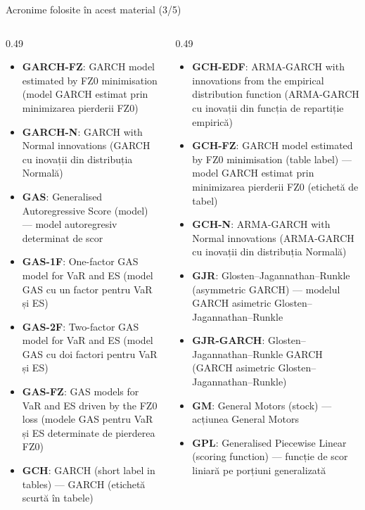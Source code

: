 \begin{frame}{Acronime folosite în acest material (3/5)}
\begin{columns}[T]
\begin{column}{0.49\textwidth}
\begin{itemize}\setlength{\itemsep}{0pt}
    \item \textbf{GARCH-FZ}: GARCH model estimated by FZ0 minimisation (model GARCH estimat prin minimizarea pierderii FZ0)
    \item \textbf{GARCH-N}: GARCH with Normal innovations (GARCH cu inovații din distribuția Normală)
    \item \textbf{GAS}: Generalised Autoregressive Score (model) — model autoregresiv determinat de scor
    \item \textbf{GAS-1F}: One-factor GAS model for VaR and ES (model GAS cu un factor pentru VaR și ES)
    \item \textbf{GAS-2F}: Two-factor GAS model for VaR and ES (model GAS cu doi factori pentru VaR și ES)
    \item \textbf{GAS-FZ}: GAS models for VaR and ES driven by the FZ0 loss (modele GAS pentru VaR și ES determinate de pierderea FZ0)
    \item \textbf{GCH}: GARCH (short label in tables) — GARCH (etichetă scurtă în tabele)
\end{itemize}
\end{column}
\begin{column}{0.49\textwidth}
\begin{itemize}\setlength{\itemsep}{0pt}
    \item \textbf{GCH-EDF}: ARMA-GARCH with innovations from the empirical distribution function (ARMA-GARCH cu inovații din funcția de repartiție empirică)
    \item \textbf{GCH-FZ}: GARCH model estimated by FZ0 minimisation (table label) — model GARCH estimat prin minimizarea pierderii FZ0 (etichetă de tabel)
    \item \textbf{GCH-N}: ARMA-GARCH with Normal innovations (ARMA-GARCH cu inovații din distribuția Normală)
    \item \textbf{GJR}: Glosten–Jagannathan–Runkle (asymmetric GARCH) — modelul GARCH asimetric Glosten–Jagannathan–Runkle
    \item \textbf{GJR-GARCH}: Glosten–Jagannathan–Runkle GARCH (GARCH asimetric Glosten–Jagannathan–Runkle)
    \item \textbf{GM}: General Motors (stock) — acțiunea General Motors
    \item \textbf{GPL}: Generalised Piecewise Linear (scoring function) — funcție de scor liniară pe porțiuni generalizată
\end{itemize}
\end{column}
\end{columns}
\end{frame}
